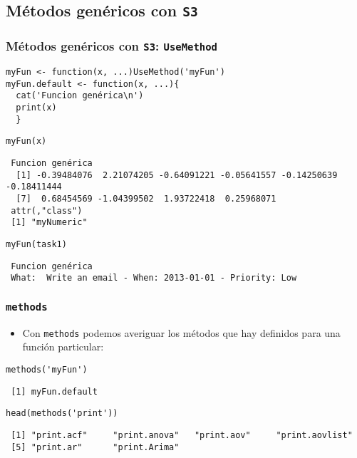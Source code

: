 \documentclass[xcolor={usenames,svgnames,dvipsnames}]{beamer}
\begin{document}
\subsection{Métodos genéricos con \texttt{S3}}
\label{sec-2-3}
\begin{frame}[fragile]
\frametitle{Métodos genéricos con \texttt{S3}: \texttt{UseMethod}}
\label{sec-2-3-1}


\lstset{language=R}
\begin{lstlisting}
myFun <- function(x, ...)UseMethod('myFun')
myFun.default <- function(x, ...){
  cat('Funcion genérica\n')
  print(x)
  }
\end{lstlisting}



\lstset{language=R}
\begin{lstlisting}
myFun(x)
\end{lstlisting}

\begin{verbatim}
 Funcion genérica
  [1] -0.39484076  2.21074205 -0.64091221 -0.05641557 -0.14250639 -0.18411444
  [7]  0.68454569 -1.04399502  1.93722418  0.25968071
 attr(,"class")
 [1] "myNumeric"
\end{verbatim}


\lstset{language=R}
\begin{lstlisting}
myFun(task1)
\end{lstlisting}

\begin{verbatim}
 Funcion genérica
 What:  Write an email - When: 2013-01-01 - Priority: Low
\end{verbatim}
\end{frame}
\begin{frame}[fragile]
\frametitle{\texttt{methods}}
\label{sec-2-3-2}

\begin{itemize}
\item Con \texttt{methods} podemos averiguar los métodos que hay definidos para una función particular:
\end{itemize}

\lstset{language=R}
\begin{lstlisting}
methods('myFun')
\end{lstlisting}

\begin{verbatim}
 [1] myFun.default
\end{verbatim}


\lstset{language=R}
\begin{lstlisting}
head(methods('print'))
\end{lstlisting}

\begin{verbatim}
 [1] "print.acf"     "print.anova"   "print.aov"     "print.aovlist"
 [5] "print.ar"      "print.Arima"
\end{verbatim}
\end{frame}
\end{document}
